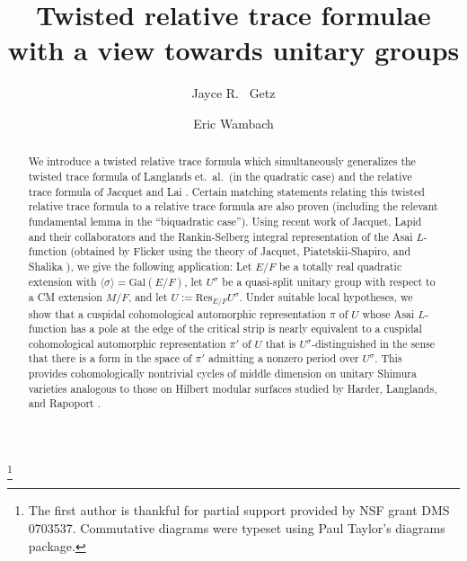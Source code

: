 \documentclass[12pt]{amsart}
\theoremstyle{remark}
\numberwithin{equation}{section}
\newcommand{\Gal}{\mathrm{Gal}}
\theoremstyle{definition}
\numberwithin{equation}{subsection}
\begin{document}
\title[Relative trace formulae and unitary groups]{Twisted relative trace formulae\\ with a view towards unitary groups}
\author{Jayce R.~ Getz}
\address{Department of Mathematics\\
Duke University\\
Durham, NC 27708-0320}
\author{Eric Wambach}
\address{Department of Mathematics \\ California
Institute of Technology \\ Pasadena, CA
91125}
\thanks{The first author is thankful for partial support provided by NSF grant DMS 0703537.  Commutative diagrams were
typeset using Paul Taylor's diagrams package.}


\begin{abstract}
We introduce a twisted relative trace formula which simultaneously generalizes the twisted trace formula of Langlands et.~al.~(in the quadratic case)
 and the relative trace formula
of Jacquet and Lai \cite{JacquetLai}.  Certain matching statements
relating this twisted relative
trace formula to a relative trace formula are also proven
(including the relevant fundamental lemma in the ``biquadratic case'').
Using recent work of Jacquet, Lapid and their
collaborators \cite{JacquetKlII} and the Rankin-Selberg integral
representation of the Asai $L$-function (obtained by Flicker using
 the theory of Jacquet, Piatetskii-Shapiro, and
 Shalika \cite{FlickerDist}), we give the following application:
Let $E/F$ be a totally real quadratic extension
 with $\langle \sigma \rangle=\Gal(E/F)$, let $U^{\sigma}$ be a quasi-split unitary group with respect
 to a CM extension $M/F$, and let $U:=\mathrm{Res}_{E/F}U^{\sigma}$.
 Under suitable local hypotheses, we show that a cuspidal
 cohomological automorphic representation $\pi$ of $U$ whose Asai $L$-function has a pole at the edge of the critical strip
 is nearly equivalent to a cuspidal
 cohomological automorphic representation $\pi'$ of $U$ that is
 $U^{\sigma}$-distinguished in the sense that there is a form in the space of $\pi'$ admitting a nonzero period over $U^{\sigma}$.  This provides cohomologically nontrivial cycles of middle dimension on unitary Shimura varieties analogous to those on Hilbert modular surfaces studied by Harder, Langlands, and Rapoport \cite{HLR}.
\end{abstract}

\maketitle
\end{document}
